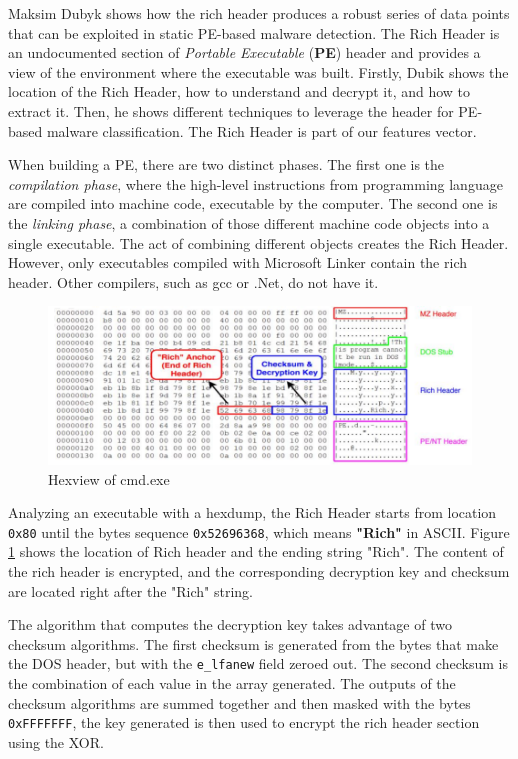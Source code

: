 Maksim Dubyk \cite{dubyk2019sans} shows how the rich header produces a robust series of data points that can be exploited in static PE-based malware detection. The Rich Header is an undocumented section of \textit{Portable Executable} (\textbf{PE}) header and provides a view of the environment where the executable was built. Firstly, Dubik shows the location of the Rich Header, how to understand and decrypt it, and how to extract it. Then, he shows different techniques to leverage the header for PE-based malware classification. The Rich Header is part of our features vector.

When building a PE, there are two distinct phases. The first one is the \textit{compilation phase}, where the high-level instructions from programming language are compiled into machine code, executable by the computer. The second one is the \textit{linking phase}, a combination of those different machine code objects into a single executable. The act of combining different objects creates the Rich Header. However, only executables compiled with Microsoft Linker contain the rich header. Other compilers, such as gcc or .Net,  do not have it.

\begin{figure}[!h]
	\centering
	\includegraphics[width=1.0\columnwidth]{cmd.png}
	\caption{Hexview of cmd.exe}
	\label{fig:cmd}
\end{figure}

Analyzing an executable with a hexdump, the Rich Header starts from location \texttt{0x80} until the bytes sequence \texttt{0x52696368}, which means \textbf{"Rich"} in ASCII. Figure \ref{fig:cmd} shows the location of Rich header and the ending string "Rich". The content of the rich header is encrypted, and the corresponding decryption key and checksum are located right after the "Rich" string. 

The algorithm that computes the decryption key takes advantage of two checksum algorithms. The first checksum is generated from the bytes that make the DOS header, but with the \texttt{e\_lfanew} field zeroed out\cite{richHeaderHunting}. The second checksum is the combination of each value in the array generated. The outputs of the checksum algorithms are summed together and then masked with the bytes \texttt{0xFFFFFFF}, the key generated is then used to encrypt the rich header section using the XOR.

